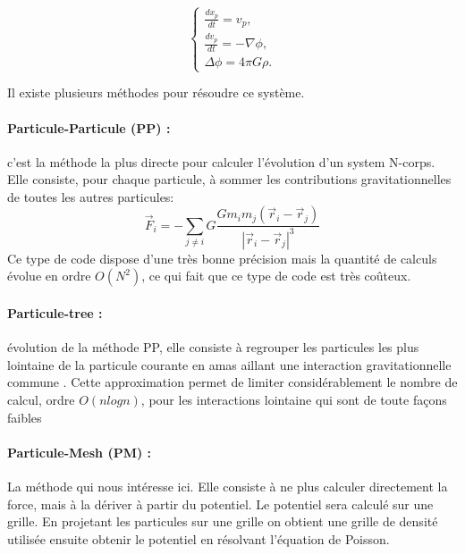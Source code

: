 \begin{equation}
\begin{cases}
\frac{d{x}_p}{dt} = { v}_p, \\
\frac{d{ v}_p}{dt} = -\nabla \phi , \\
\Delta \phi= 4\pi G \rho.
\end{cases}
\label{eq:Ncorps}
\end{equation}

Il existe plusieurs méthodes pour résoudre ce système.
\paragraph{Particule-Particule (PP) : } c'est la méthode la plus directe pour calculer l'évolution d'un system N-corps. 
Elle consiste, pour chaque particule, à sommer les contributions gravitationnelles de toutes les autres particules:
\begin{equation}
\vec{F}_i=-\sum_{j\neq i} G \frac{G m_i m_j(\vec{r}_i - \vec{r}_j) }{ |\vec{r}_i - \vec{r}_j |^3}
\end{equation}
Ce type de code dispose d'une très bonne précision mais la quantité de calculs évolue en ordre $O(N^2)$, ce qui fait que ce type de code est très coûteux.

\paragraph{Particule-tree : } évolution de la méthode PP, elle consiste à regrouper les particules les plus lointaine de la particule courante en amas aillant une interaction gravitationnelle commune \citep{1986Natur.324..446B}.
Cette approximation permet de limiter considérablement le nombre de calcul, ordre $O(n log n)$, pour les interactions lointaine qui sont de toute façons faibles 



%


\paragraph{Particule-Mesh (PM) : } La méthode qui nous intéresse ici.
Elle consiste à ne plus calculer directement la force, mais à la dériver à partir du potentiel.
Le potentiel sera calculé sur une grille.
En projetant les particules sur une grille on obtient une grille de densité utilisée ensuite obtenir le potentiel en résolvant l'équation de Poisson.

